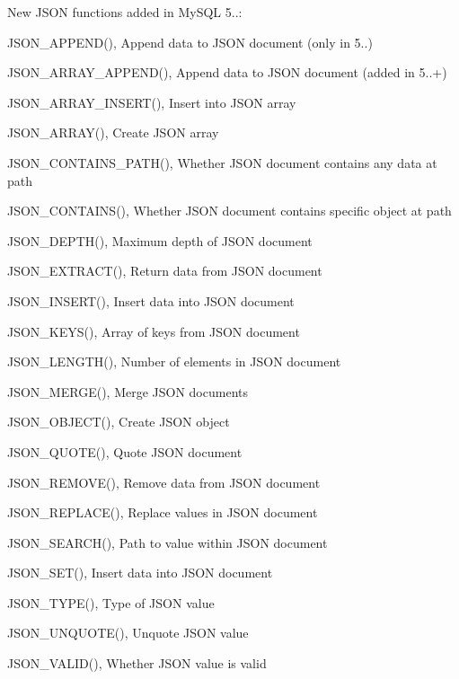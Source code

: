 New J\+S\+ON functions added in My\+S\+QL 5..\+:
\begin{DoxyItemize}
\item J\+S\+O\+N\+\_\+\+A\+P\+P\+E\+N\+D(), Append data to J\+S\+ON document (only in 5..)
\item J\+S\+O\+N\+\_\+\+A\+R\+R\+A\+Y\+\_\+\+A\+P\+P\+E\+N\+D(), Append data to J\+S\+ON document (added in 5..+)
\item J\+S\+O\+N\+\_\+\+A\+R\+R\+A\+Y\+\_\+\+I\+N\+S\+E\+R\+T(), Insert into J\+S\+ON array
\item J\+S\+O\+N\+\_\+\+A\+R\+R\+A\+Y(), Create J\+S\+ON array
\item J\+S\+O\+N\+\_\+\+C\+O\+N\+T\+A\+I\+N\+S\+\_\+\+P\+A\+T\+H(), Whether J\+S\+ON document contains any data at path
\item J\+S\+O\+N\+\_\+\+C\+O\+N\+T\+A\+I\+N\+S(), Whether J\+S\+ON document contains specific object at path
\item J\+S\+O\+N\+\_\+\+D\+E\+P\+T\+H(), Maximum depth of J\+S\+ON document
\item J\+S\+O\+N\+\_\+\+E\+X\+T\+R\+A\+C\+T(), Return data from J\+S\+ON document
\item J\+S\+O\+N\+\_\+\+I\+N\+S\+E\+R\+T(), Insert data into J\+S\+ON document
\item J\+S\+O\+N\+\_\+\+K\+E\+Y\+S(), Array of keys from J\+S\+ON document
\item J\+S\+O\+N\+\_\+\+L\+E\+N\+G\+T\+H(), Number of elements in J\+S\+ON document
\item J\+S\+O\+N\+\_\+\+M\+E\+R\+G\+E(), Merge J\+S\+ON documents
\item J\+S\+O\+N\+\_\+\+O\+B\+J\+E\+C\+T(), Create J\+S\+ON object
\item J\+S\+O\+N\+\_\+\+Q\+U\+O\+T\+E(), Quote J\+S\+ON document
\item J\+S\+O\+N\+\_\+\+R\+E\+M\+O\+V\+E(), Remove data from J\+S\+ON document
\item J\+S\+O\+N\+\_\+\+R\+E\+P\+L\+A\+C\+E(), Replace values in J\+S\+ON document
\item J\+S\+O\+N\+\_\+\+S\+E\+A\+R\+C\+H(), Path to value within J\+S\+ON document
\item J\+S\+O\+N\+\_\+\+S\+E\+T(), Insert data into J\+S\+ON document
\item J\+S\+O\+N\+\_\+\+T\+Y\+P\+E(), Type of J\+S\+ON value
\item J\+S\+O\+N\+\_\+\+U\+N\+Q\+U\+O\+T\+E(), Unquote J\+S\+ON value
\item J\+S\+O\+N\+\_\+\+V\+A\+L\+I\+D(), Whether J\+S\+ON value is valid 
\end{DoxyItemize}\mbox{\label{classtestsuite_1_1regression_1_1_syntax_regression_test_ab5d200050de3d77c76405bdda78d95a6}} 
